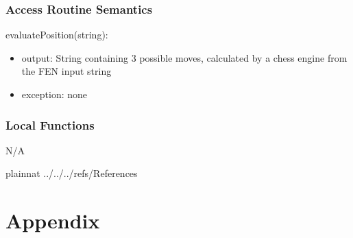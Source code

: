 \documentclass[12pt, titlepage]{article}
\begin{document}
    \subsubsection{Access Routine Semantics}
        \noindent evaluatePosition(string):
        \begin{itemize}
            \item output: String containing 3 possible moves, calculated by a chess engine from the FEN input string
            \item exception: none
        \end{itemize}

    \subsubsection{Local Functions}
    N/A

\newpage
\newpage

 {plainnat}
 {../../../refs/References}

\newpage

\section{Appendix} \label{Appendix}

\end{document}
